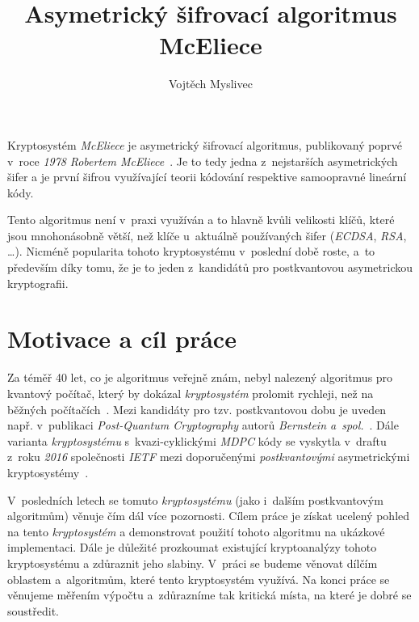 \documentclass[thesis=M,czech,hidelinks]{FITthesis}[2012/06/26]
\title{Asymetrický šifrovací algoritmus McEliece}
\author{Vojtěch Myslivec}
\newcommand{\0}{{\textcolor[gray]{0.75}{0}}}
\begin{document}
\begin{introduction}

Kryptosystém \emph{McEliece} je asymetrický šifrovací algoritmus, publikovaný
poprvé v~roce \emph{1978} \emph{Robertem McEliece}~\cite{McEliece}. Je to tedy
jedna z~nejstarších asymetrických šifer a je první šifrou využívající teorii
kódování respektive samoopravné lineární kódy.

Tento algoritmus není v~praxi využíván a to hlavně kvůli velikosti klíčů, které
jsou mnohonásobně větší, než klíče u~aktuálně používaných šifer (\emph{EC\-DSA},
\emph{RSA}, \ldots). Nicméně popularita tohoto kryptosystému v~poslední době
roste, a~to především díky tomu, že je to jeden z~kandidátů pro postkvantovou
asymetrickou kryptografii.


\section*{Motivace a cíl práce}

Za téměř 40 let, co je algoritmus veřejně znám, nebyl nalezený algoritmus pro
kvantový počítač, který by dokázal \emph{kryptosystém} prolomit rychleji, než na
běžných počítačích~\cite{Dinh}. Mezi kandidáty pro tzv. postkvantovou dobu je
uveden např. v~publikaci \emph{Post-Quantum Cryptography} autorů \emph{Bernstein
a~spol.}~\cite{Post-Quantum_Cryptography}. Dále varianta \emph{kryptosystému}
s~kvazi-cyklickými \emph{MDPC} kódy se vyskytla v~draftu z~roku \emph{2016}
společnosti \emph{IETF} mezi doporučenými \emph{postkvantovými} asymetrickými
kryptosystémy~\cite{Schanck}.

V~posledních letech se tomuto \emph{kryptosystému} (jako i~dalším postkvantovým
algoritmům) věnuje čím dál více pozornosti. Cílem práce je získat ucelený pohled
na tento \emph{kryptosystém} a demonstrovat použití tohoto algoritmu na ukázkové
implementaci. Dále je důležité prozkoumat existující kryptoanalýzy tohoto
kryptosystému a zdůraznit jeho slabiny. V~práci se budeme věnovat dílčím
oblastem a~algoritmům, které tento kryptosystém využívá. Na konci práce se
věnujeme měřením výpočtu a~zdůrazníme tak kritická místa, na které je dobré se
soustředit.



\end{introduction}
\end{document}
